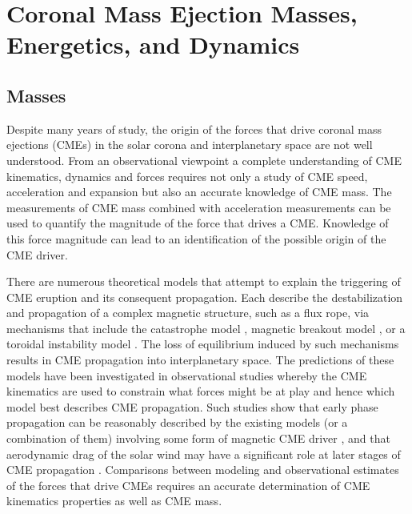 
\singlespacing
\chapter{Coronal Mass Ejection Masses, Energetics, and Dynamics} 
\label{chap:4}
\doublespacing

\section{Masses}\label{sec:1}

Despite many years of study, the origin of the forces that drive coronal mass ejections (CMEs) in the solar corona and interplanetary space are not 
well understood. 
From an observational viewpoint a complete understanding of CME kinematics, dynamics and forces requires not only a study of CME speed, 
acceleration and expansion but also an accurate knowledge of CME mass.  The measurements of CME mass combined with acceleration 
measurements can be used to quantify the magnitude of the force that drives a CME. Knowledge of this force magnitude can lead to an 
identification of the possible origin of the CME driver. 

There are numerous theoretical models that attempt to explain the triggering of CME eruption and its consequent propagation. Each describe the 
destabilization and propagation of a complex magnetic structure, such as a flux rope, via mechanisms that include the catastrophe model \citep
{forbes1991,forbes1995,lin2000}, magnetic breakout model \citep{antio99,lynch2008}, or a toroidal instability model \citep{chen1996,kleim2006}. 
The loss of equilibrium induced by such mechanisms results in CME propagation into interplanetary space. The predictions of these models have 
been investigated in observational studies whereby the CME kinematics are used to constrain what forces might be at play and hence which model 
best describes CME propagation. Such studies show that early phase propagation can be reasonably described by the existing models (or a 
combination of them) involving some form of magnetic CME driver \citep{manoh2003, chen2006, Schrij2008, lin2010}, and that aerodynamic drag 
of the solar wind may have a significant role at later stages of CME propagation \citep{howard2007, malo10, byr10}. Comparisons between 
modeling and observational estimates of the forces that drive CMEs requires an accurate determination of CME kinematics properties as well as 
CME mass.

